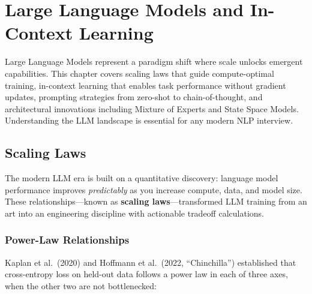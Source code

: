 
\chapter{Large Language Models and In-Context Learning}
\label{chap:llms_icl}

\begin{tldr}
Large Language Models represent a paradigm shift where scale unlocks emergent
capabilities.  This chapter covers scaling laws that guide compute-optimal
training, in-context learning that enables task performance without gradient
updates, prompting strategies from zero-shot to chain-of-thought, and
architectural innovations including Mixture of Experts and State Space Models.
Understanding the LLM landscape is essential for any modern NLP interview.
\end{tldr}

\bigskip

\section{Scaling Laws}
\label{sec:scaling_laws}

The modern LLM era is built on a quantitative discovery: language model
performance improves \emph{predictably} as you increase compute, data, and
model size.  These relationships---known as \textbf{scaling laws}---transformed
LLM training from an art into an engineering discipline with actionable
tradeoff calculations.

\subsection{Power-Law Relationships}

Kaplan et al.\ (2020) and Hoffmann et al.\ (2022, ``Chinchilla'') established
that cross-entropy loss on held-out data follows a power law in each of three
axes, when the other two are not bottlenecked:

